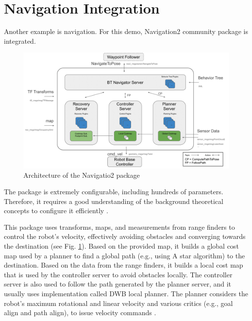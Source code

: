 \section{Navigation Integration}
Another example is navigation. For this demo, Navigation2 community package is integrated.  
\begin{figure}[H]
    \centering
    \includegraphics[width=\textwidth]{demos/figures/navigation_overview.png}
    \caption[Architecture of the Navigatio2 package]{Architecture of the Navigatio2 package\footnotemark}
    \label{fig:demos:navigation_overview}
\end{figure}

The package is extremely configurable, including hundreds of parameters. Therefore, it requires a good understanding of the background theoretical concepts to configure it efficiently \cite{zheng_ros_nodate}.

This package uses transforms, maps, and measurements from range finders to control the robot's velocity, effectively avoiding obstacles and converging towards the destination (see Fig. \ref{fig:demos:navigation_overview}). Based on the provided map, it builds a global cost map used by a planner to find a global path (e.g., using A star algorithm) to the destination. Based on the data from the range finders, it builds a local cost map that is used by the controller server to avoid obstacles locally. The controller server is also used to follow the path generated by the planner server, and it usually uses implementation called DWB local planner. The planner considers the robot's maximum rotational and linear velocity and various critics (e.g., goal align and path align), to issue velocity commands \cite{macenski_marathon_2020-1}. 

